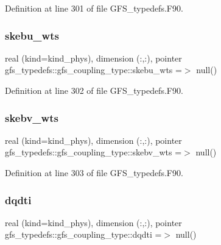 Definition at line 301 of file G\+F\+S\+\_\+typedefs.\+F90.

\mbox{\label{structgfs__typedefs_1_1gfs__coupling__type_a310e647b480c2eb9c5a0556a32c1b899}} 
\subsubsection{skebu\+\_\+wts}
{\footnotesize\ttfamily real (kind=kind\+\_\+phys), dimension (\+:,\+:), pointer gfs\+\_\+typedefs\+::gfs\+\_\+coupling\+\_\+type\+::skebu\+\_\+wts =$>$ null()}



Definition at line 302 of file G\+F\+S\+\_\+typedefs.\+F90.

\mbox{\label{structgfs__typedefs_1_1gfs__coupling__type_ab4c8736bfd7e828907109f92d731cf29}} 
\subsubsection{skebv\+\_\+wts}
{\footnotesize\ttfamily real (kind=kind\+\_\+phys), dimension (\+:,\+:), pointer gfs\+\_\+typedefs\+::gfs\+\_\+coupling\+\_\+type\+::skebv\+\_\+wts =$>$ null()}



Definition at line 303 of file G\+F\+S\+\_\+typedefs.\+F90.

\mbox{\label{structgfs__typedefs_1_1gfs__coupling__type_a7f9380b74a15b927cb16bf0c462e5c0c}} 
\subsubsection{dqdti}
{\footnotesize\ttfamily real (kind=kind\+\_\+phys), dimension   (\+:,\+:), pointer gfs\+\_\+typedefs\+::gfs\+\_\+coupling\+\_\+type\+::dqdti =$>$ null()}



